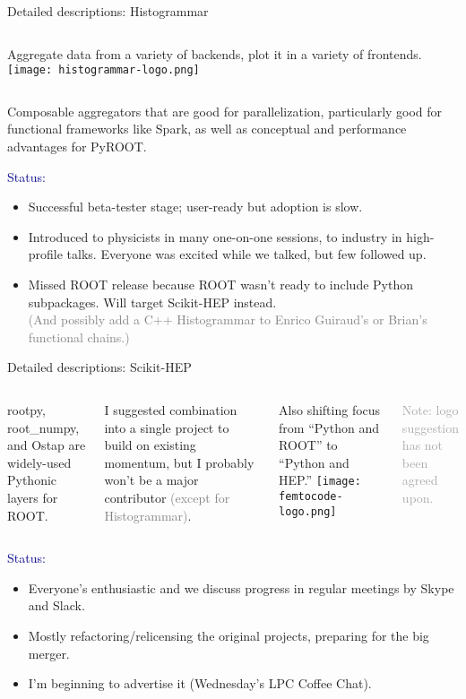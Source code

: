 \documentclass{beamer}
\begin{document}
\begin{frame}{Detailed descriptions: Histogrammar}
\vspace{0.6 cm}
\begin{columns}
Aggregate data from a variety of backends, plot it in a variety of frontends.
\texttt{[image: histogrammar-logo.png]}
\end{columns}

\vspace{0.4 cm}
Composable aggregators that are good for parallelization, particularly good for functional frameworks like Spark, as well as conceptual and performance advantages for PyROOT.

\vspace{0.4 cm}
\textcolor{darkblue}{Status:}
\begin{itemize}
\item Successful beta-tester stage; user-ready but adoption is slow.
\item Introduced to physicists in many one-on-one sessions, to industry in high-profile talks. Everyone was excited while we talked, but few followed up.
\item Missed ROOT release because ROOT wasn't ready to include Python subpackages. Will target Scikit-HEP instead. \\ \textcolor{gray}{(And possibly add a C++ Histogrammar to Enrico Guiraud's or Brian's functional chains.)}
\end{itemize}
\end{frame}

\begin{frame}{Detailed descriptions: Scikit-HEP}
\vspace{0.5 cm}
\begin{columns}
rootpy, root\_numpy, and Ostap are widely-used Pythonic layers for ROOT.

\vspace{0.2 cm}
I suggested combination into a single project to build on existing momentum, but I probably won't be a major contributor \textcolor{gray}{(except for Histogrammar)}.

\vspace{0.2 cm}
Also shifting focus from ``Python and ROOT'' to ``Python and HEP.''
\scriptsize
\texttt{[image: femtocode-logo.png]}

\textcolor{darkgray}{Note: logo suggestion has not been agreed upon.}
\end{columns}

\vspace{0.4 cm}
\textcolor{darkblue}{Status:}
\begin{itemize}
\item Everyone's enthusiastic and we discuss progress in regular meetings by Skype and Slack.
\item Mostly refactoring/relicensing the original projects, preparing for the big merger.
\item I'm beginning to advertise it (Wednesday's LPC Coffee Chat).
\end{itemize}
\end{frame}
\end{document}
